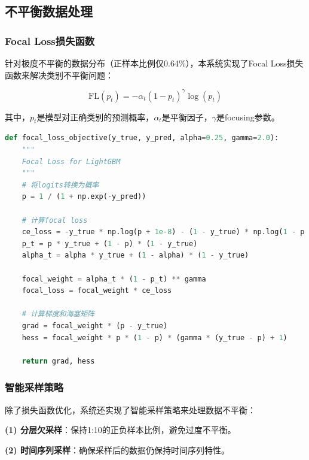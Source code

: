 \documentclass[12pt,a4paper]{article}
\begin{document}
\subsection{不平衡数据处理}

\subsubsection{Focal Loss损失函数}

针对极度不平衡的数据分布（正样本比例仅0.64\%），本系统实现了Focal Loss损失函数来解决类别不平衡问题：

$$\text{FL}(p_t) = -\alpha_t (1-p_t)^\gamma \log(p_t)$$

其中，$p_t$是模型对正确类别的预测概率，$\alpha_t$是平衡因子，$\gamma$是focusing参数。

\begin{lstlisting}[language=Python, caption=Focal Loss实现]
def focal_loss_objective(y_true, y_pred, alpha=0.25, gamma=2.0):
    """
    Focal Loss for LightGBM
    """
    # 将logits转换为概率
    p = 1 / (1 + np.exp(-y_pred))
    
    # 计算focal loss
    ce_loss = -y_true * np.log(p + 1e-8) - (1 - y_true) * np.log(1 - p + 1e-8)
    p_t = p * y_true + (1 - p) * (1 - y_true)
    alpha_t = alpha * y_true + (1 - alpha) * (1 - y_true)
    
    focal_weight = alpha_t * (1 - p_t) ** gamma
    focal_loss = focal_weight * ce_loss
    
    # 计算梯度和海塞矩阵
    grad = focal_weight * (p - y_true)
    hess = focal_weight * p * (1 - p) * (gamma * (y_true - p) + 1)
    
    return grad, hess
\end{lstlisting}

\subsubsection{智能采样策略}

除了损失函数优化，系统还实现了智能采样策略来处理数据不平衡：

\textbf{(1) 分层欠采样}：保持1:10的正负样本比例，避免过度不平衡。

\textbf{(2) 时间序列采样}：确保采样后的数据仍保持时间序列特性。
\end{document}
